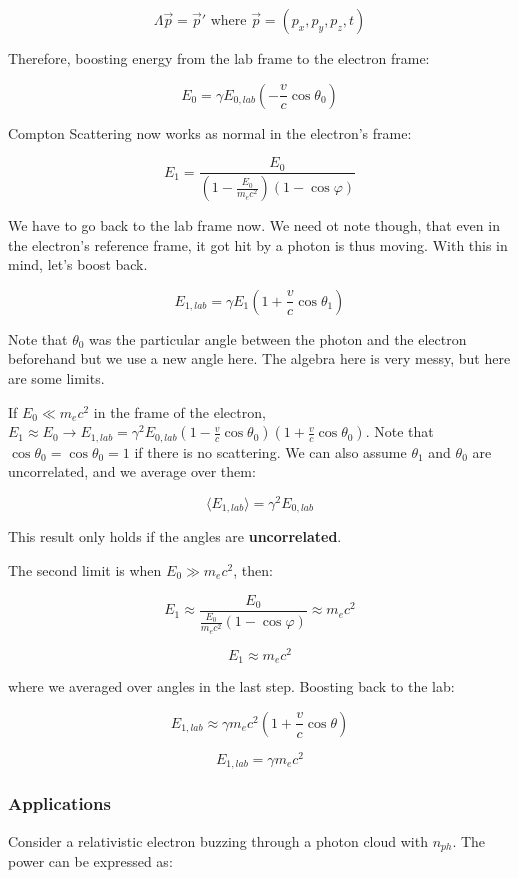 \documentclass{article}
\begin{document}
$$
\Lambda \vec{p} = \vec{p}' \text{ where } \vec{p} = (p_x,p_y,p_z,t)
$$

Therefore, boosting energy from the lab frame to the electron frame:

$$
E_0 = \gamma E_{0,lab}\left(-\frac{v}{c}\cos\theta_0\right)
$$

Compton Scattering now works as normal in the electron's frame:

$$
E_1 = \frac{E_0}{\left(1 - \frac{E_0}{m_e c^2}\right)\left(1 - \cos\varphi\right)}
$$

We have to go back to the lab frame now. We need ot note though, that even in the electron's reference frame, it got hit by a photon is thus moving. With this in mind, let's boost back. 

$$
E_{1,lab} = \gamma E_1 \left(1+\frac{v}{c}\cos\theta_1\right)
$$

Note that $\theta_0$ was the particular angle between the photon and the electron beforehand but we use a new angle here. The algebra here is very messy, but here are some limits. 

If $E_0 \ll m_e c^2$ in the frame of the electron, $E_1 \approx E_0 \rightarrow E_{1,lab} = \gamma^2 E_{0,lab}\left(1-\frac{v}{c}\cos\theta_0\right)\left(1+\frac{v}{c}\cos\theta_0\right)$. Note that $\cos\theta_0 = \cos\theta_0 = 1$ if there is no scattering. We can also assume $\theta_1 $ and $\theta_0$ are uncorrelated, and we average over them:

$$
\boxed{\langle E_{1,lab} \rangle = \gamma^2 E_{0,lab}}
$$

This result only holds if the angles are \textbf{uncorrelated}.

The second limit is when $E_0 \gg m_e c^2$, then:

$$
E_1 \approx \frac{E_0}{\frac{E_0}{m_e c^2} (1-\cos\varphi)} \approx m_e c^2
$$

$$
E_1 \approx m_e c^2
$$

where we averaged over angles in the last step. Boosting back to the lab:

$$
E_{1,lab} \approx \gamma m_e c^2 \left(1+\frac{v}{c}\cos\theta\right)
$$

$$
E_{1,lab} = \gamma m_e c^2
$$

\subsubsection{Applications}

Consider a relativistic electron buzzing through a photon cloud with $n_{ph}$. The power can be expressed as:
\end{document}
